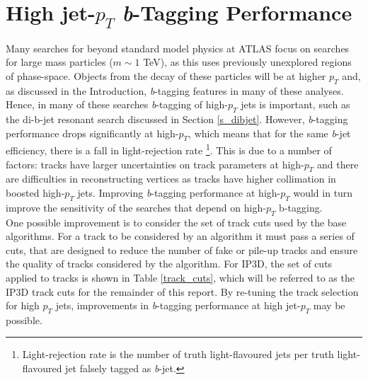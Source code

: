 \documentclass[12pt, onecolumn,notitlepage]{article}
\begin{document}
\section{High jet-$p_{T}$ \textit{b}-Tagging Performance} \label{s_high_pt_btag}

Many searches for beyond standard model physics at ATLAS focus on searches for large mass particles 
($m \sim 1$ TeV), as this uses previously unexplored regions of phase-space.
Objects from the decay of these particles will be at higher $p_T$ and, as discussed in the Introduction,
\textit{b}-tagging features in many of these analyses.
Hence, in many of these searches \textit{b}-tagging of high-$p_{T}$ jets is important, such as the di-b-jet resonant search discussed in Section \ref{s_dibjet}.
However, \textit{b}-tagging performance drops significantly at high-$p_{T}$, which means that for the same \textit{b}-jet efficiency, 
there is a fall in light-rejection rate \footnote{Light-rejection rate is the number of truth light-flavoured jets per truth 
light-flavoured jet falsely tagged as \textit{b}-jet.}.
This is due to a number of factors: tracks have larger uncertainties on track parameters at high-$p_T$ and 
there are difficulties in reconstructing vertices as tracks have higher collimation in boosted high-$p_T$ jets.
Improving \textit{b}-tagging performance at high-$p_T$ would in turn improve the sensitivity of the searches that depend on high-$p_T$ b-tagging. \\


One possible improvement is to consider the set of track cuts used by the base algorithms.
For a track to be considered by an algorithm it must pass a series of cuts, that are designed to 
reduce the number of fake or pile-up tracks and ensure the quality of tracks considered by the algorithm.
For IP3D, the set of cuts applied to tracks is shown in Table \ref{track_cuts}, 
which will be referred to as the IP3D track cuts for the remainder of this report.
By re-tuning the track selection for high $p_T$ jets, improvements in \textit{b}-tagging performance at high jet-$p_T$ may be possible. \\
\end{document}
